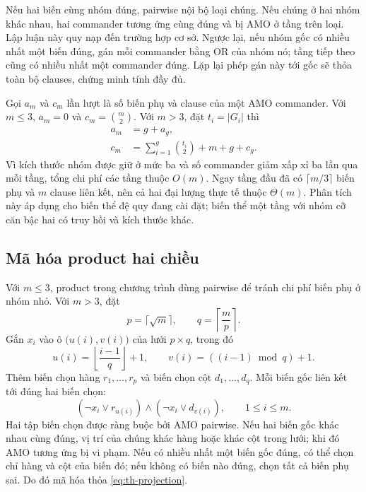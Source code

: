 Nếu hai biến cùng nhóm đúng, pairwise nội bộ loại chúng. Nếu chúng ở
hai nhóm khác nhau, hai commander tương ứng cùng đúng và bị AMO ở tầng
trên loại. Lập luận này quy nạp đến trường hợp cơ sở. Ngược lại, nếu nhóm
gốc có nhiều nhất một biến đúng, gán mỗi commander bằng OR của nhóm nó;
tầng tiếp theo cũng có nhiều nhất một commander đúng. Lặp lại phép gán
này tới gốc sẽ thỏa toàn bộ clauses, chứng minh tính đầy đủ.

Gọi $a_m$ và $c_m$ lần lượt là số biến phụ và clause của một AMO
commander. Với $m\leq3$, $a_m=0$ và $c_m=\binom{m}{2}$.
Với $m>3$, đặt $t_i=|G_i|$ thì
\begin{align}
 a_m&=g+a_g,\\
 c_m&=\sum_{i=1}^{g}\binom{t_i}{2}+m+g+c_g.
 \label{eq:th-comm-count}
\end{align}
Vì kích thước nhóm được giữ ở mức ba và số commander giảm xấp xỉ ba
lần qua mỗi tầng, tổng chi phí các tầng thuộc $O(m)$. Ngay tầng đầu
đã có $\lceil m/3\rceil$ biến phụ và $m$ clause liên kết, nên cả hai
đại lượng thực tế thuộc $\Theta(m)$. Phân tích này áp dụng cho biến thể
đệ quy đang cài đặt; biến thể một tầng với nhóm cỡ căn bậc hai có truy
hồi và kích thước khác.

\subsection{Mã hóa product hai chiều}

Với $m\leq3$, product trong chương trình dùng pairwise để tránh chi phí
biến phụ ở nhóm nhỏ. Với $m>3$, đặt
\begin{equation}
 p=\lceil\sqrt m\rceil,\qquad q=\left\lceil\frac{m}{p}\right\rceil.
\end{equation}
Gắn $x_i$ vào ô $\bigl(u(i),v(i)\bigr)$ của lưới $p\times q$, trong đó
\begin{equation}
 u(i)=\left\lfloor\frac{i-1}{q}\right\rfloor+1,
 \qquad v(i)=((i-1)\bmod q)+1.
\end{equation}
Thêm biến chọn hàng $r_1,\ldots,r_p$ và biến chọn cột $d_1,\ldots,d_q$.
Mỗi biến gốc liên kết tới đúng hai biến chọn:
\begin{equation}
 (\neg x_i\lor r_{u(i)})\land(\neg x_i\lor d_{v(i)}),
 \qquad 1\leq i\leq m.
 \label{eq:th-product-links}
\end{equation}
Hai tập biến chọn được ràng buộc bởi AMO pairwise. Nếu hai biến gốc khác
nhau cùng đúng, vị trí của chúng khác hàng hoặc khác cột trong lưới;
khi đó AMO tương ứng bị vi phạm. Nếu có nhiều nhất một biến gốc đúng,
có thể chọn chỉ hàng và cột của biến đó; nếu không có biến nào đúng,
chọn tất cả biến phụ sai. Do đó mã hóa thỏa \eqref{eq:th-projection}.

